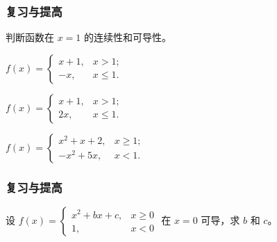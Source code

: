 \documentclass[14pt,notheorems,leqno,xcolor={rgb}]{beamer} %
\begin{document}

\begin{frame}
\frametitle{复习与提高}
\begin{review}
判断函数在 $x=1$ 的连续性和可导性。
\begin{enumlite}
  \item $f(x)=\begin{cases}x+1, & x>1; \\-x, & x\le1.\end{cases}$
  \item $f(x)=\begin{cases}x+1, & x>1; \\2x, & x\le1.\end{cases}$
  \item $f(x)=\begin{cases}x^2+x+2, & x\ge1; \\ -x^2+5x, & x<1.\end{cases}$
\end{enumlite}
\end{review}
\end{frame}

\begin{frame}
\frametitle{复习与提高}
\begin{example}
设 $f(x)=\begin{cases}x^2+bx+c, & x\ge0 \\ 1, & x<0\end{cases}$ 在 $x=0$ 可导，求 $b$ 和 $c$。
\end{example}
\end{frame}
\end{document}
